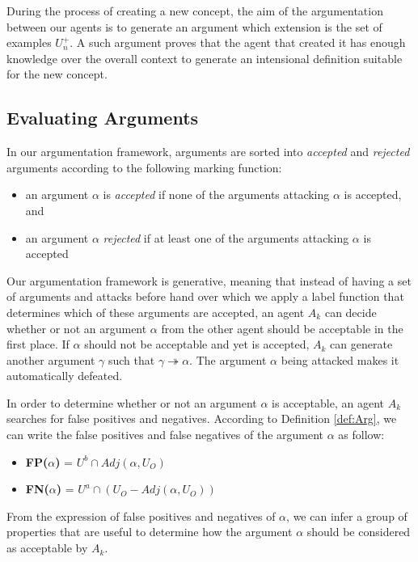 During the process of creating a new concept, the aim of the argumentation between our agents is to generate an argument which extension is the set of examples $U^{+}_{n}$. A such argument proves that the agent that created it has enough knowledge over the overall context to generate an intensional definition suitable for the new concept.

\subsection{Evaluating Arguments}

In our argumentation framework, arguments are sorted into \emph{accepted} and \emph{rejected} arguments according to the following marking function:

\begin{itemize}
    \item an argument $\alpha$ is \emph{accepted} if none of the arguments attacking $\alpha$ is accepted, and
    \item an argument $\alpha$ \emph{rejected} if at least one of the arguments attacking $\alpha$ is accepted
\end{itemize}

Our argumentation framework is generative, meaning that instead of having a set of arguments and attacks before hand over which we apply a label function that determines which of these arguments are accepted, an agent $A_{k}$ can decide whether or not an argument $\alpha$ from the other agent should be acceptable in the first place. If $\alpha$ should not be acceptable and yet is accepted, $A_{k}$ can generate another argument $\gamma$ such that $\gamma \twoheadrightarrow \alpha$. The argument $\alpha$ being attacked makes it automatically defeated.

In order to determine whether or not an argument $\alpha$ is acceptable, an agent $A_{k}$ searches for false positives and negatives. According to Definition \ref{def:Arg}, we can write the false positives and false negatives of the argument $\alpha$ as follow:

\begin{itemize}
    \item \textbf{FP($\alpha$)} = $U^{b} \cap Adj(\alpha,U_{O})$
    \item \textbf{FN($\alpha$)} = $U^{a} \cap (U_{O} - Adj(\alpha,U_{O}))$
\end{itemize}

From the expression of false positives and negatives of $\alpha$, we can infer a group of properties that are useful to determine how the argument $\alpha$ should be considered as acceptable by $A_{k}$.

